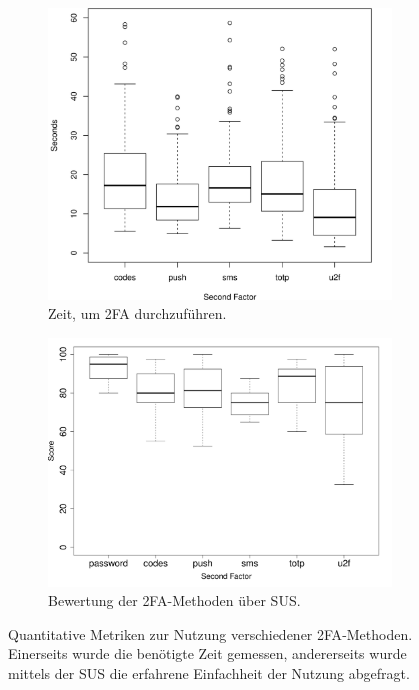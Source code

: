 \begin{figure}[!ht]
  \centering
  \begin{subfigure}{.42\textwidth}
    \includegraphics[width=\linewidth]{assets/auth-time.png}
    \caption{Zeit, um \acs{2FA} durchzuführen.}
    \label{fig:auth-time}
  \end{subfigure}
  \hspace{.025\textwidth}
  \begin{subfigure}{.505\textwidth}
    \includegraphics[width=\linewidth]{assets/auth-sus.png}
    \caption{Bewertung der \acs{2FA}-Methoden über \acs{SUS}.}
    \label{fig:auth-sus}
  \end{subfigure}
  \caption[Quantitative Metriken zur Nutzung verschiedener \acs{2FA}-Methoden]{Quantitative Metriken zur Nutzung verschiedener \acs{2FA}-Methoden. Einerseits wurde die benötigte Zeit gemessen, andererseits wurde mittels der \acf{SUS} die erfahrene Einfachheit der Nutzung abgefragt.\\\parencite[362,363]{reeseUsabilityStudy2019}}
  \label{fig:auth}
\end{figure}

